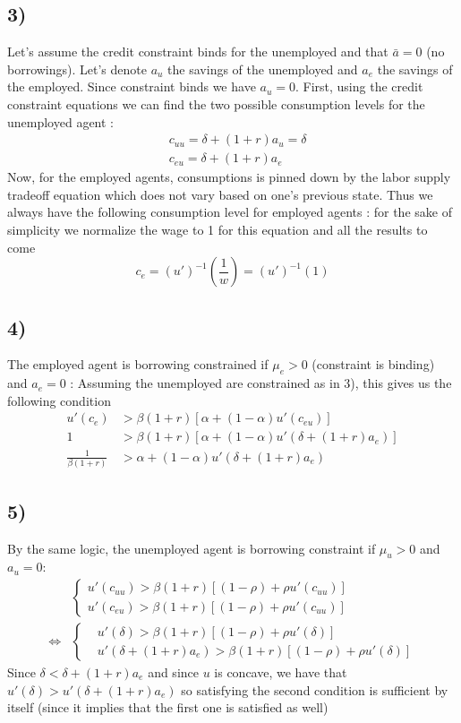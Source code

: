 \documentclass{article}
\begin{document}
\subsection*{3)}
Let's assume the credit constraint binds for the unemployed and that $\bar{a}=0$ (no borrowings). Let's denote $a_u$ the savings of the unemployed and $a_e$ the savings of the employed. Since constraint binds we have $a_u=0$. First, using the credit constraint equations we can find the two possible consumption levels for the unemployed agent : 
$$\begin{aligned}
    &c_{uu}=\delta +(1+r)a_u = \delta \\
    &c_{eu}=\delta +(1+r)a_e
\end{aligned}$$
Now, for the employed agents, consumptions is pinned down by the labor supply tradeoff equation which does not vary based on one's previous state. Thus we always have the following consumption level for employed agents : for the sake of simplicity we normalize the wage to 1 for this equation and all the results to come 
$$c_e = (u')^{-1}(\frac{1}{w})=(u')^{-1}(1)$$

\subsection*{4)}
The employed agent is borrowing constrained if $\mu_e >0$ (constraint is binding)  and $a_e = 0$ : Assuming the unemployed are constrained as in 3), this gives us the following condition
$$\begin{aligned}
    u'(c_e)&>\beta (1+r)[\alpha +(1-\alpha)u'(c_{eu})]\\
    1&> \beta (1+r)[\alpha + (1-\alpha)u'(\delta +(1+r)a_e)]\\
    \frac{1}{\beta(1+r)}&>\alpha+(1-\alpha)u'(\delta +(1+r)a_e)
\end{aligned}$$

\subsection*{5)}
By the same logic, the unemployed agent is borrowing constraint if $\mu_u >0$ and $a_u=0$:
$$\begin{aligned}
    &\left\{\begin{aligned}
    u'(c_{uu}) > \beta (1+r)[(1-\rho)+\rho u'(c_{uu})]\\
    u'(c_{eu})> \beta (1+r)[(1-\rho)+\rho u'(c_{uu})]
    \end{aligned}\right.\\
    \Leftrightarrow &\left\{\begin{aligned}
    &u'(\delta ) > \beta (1+r)[(1-\rho)+\rho u'(\delta)]\\
    &u'(\delta +(1+r)a_e)> \beta (1+r)[(1-\rho)+\rho u'(\delta)]
    \end{aligned}\right.
\end{aligned}
$$
Since $\delta < \delta +(1+r)a_e$ and since $u$ is concave, we have that $u'(\delta) >u'(\delta +(1+r)a_e)$ so satisfying the second condition is sufficient by itself (since it implies that the first one is satisfied as well)
\end{document}
